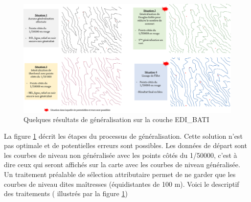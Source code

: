 \begin{figure}[ht]
\centering
\includegraphics[width=\linewidth]{images/chap1/sherbend.png}
\caption{Quelques résultats de généralisation sur la couche EDI\_BATI}
\label{situation_sherbend}
\end{figure}
La figure \ref{situation_sherbend} décrit les étapes du processus de généralisation.
{\color{magenta} Cette solution n'est pas optimale et de potentielles erreurs sont possibles. }
Les données de départ sont les courbes de niveau non généralisée avec les points côtés  du 1/50000, c'est à dire ceux qui seront affichés sur la carte avec les courbes de niveau généralisée.
Un traitement préalable de sélection attributaire permet de ne garder que les courbes de niveau dites maîtresses (équidistantes de 100 m). Voici le descriptif des traitements ( illustrés par la figure \ref{situation_sherbend})

